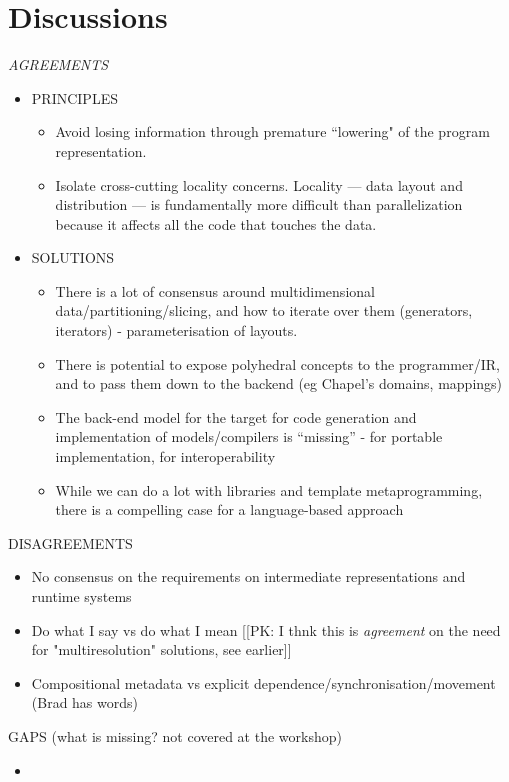\section{Discussions}

{\it
AGREEMENTS
\begin{itemize}
\item PRINCIPLES
  \begin{itemize}
  \item Avoid losing information through premature ``lowering" of the program representation.
  \item Isolate cross-cutting locality concerns.  Locality --- data layout and distribution --- is fundamentally more difficult than parallelization because it affects all the code that touches the data.   
  \end{itemize}
\item SOLUTIONS
  \begin{itemize}
  \item There is a lot of consensus around multidimensional data/partitioning/slicing, and how to iterate over them (generators, iterators) - parameterisation of layouts.
  \item There is potential to expose polyhedral concepts to the programmer/IR, and to pass them down to the backend (eg Chapel’s domains, mappings)
  \item The back-end model for the target for code generation and implementation of models/compilers is “missing” - for portable implementation, for interoperability
  \item While we can do a lot with libraries and template metaprogramming, there is a compelling case for a language-based approach
  \end{itemize}
\end{itemize}

DISAGREEMENTS
  \begin{itemize}
   \item No consensus on the requirements on intermediate representations and runtime systems
   \item Do what I say vs do what I mean [[PK: I thnk this is \emph{agreement} on the need for "multiresolution" solutions, see earlier]]
   \item Compositional metadata vs explicit dependence/synchronisation/movement (Brad has words)
  \end{itemize}


  GAPS (what is missing? not covered at the workshop)
  \begin{itemize}
   \item
   \end{itemize}

}
